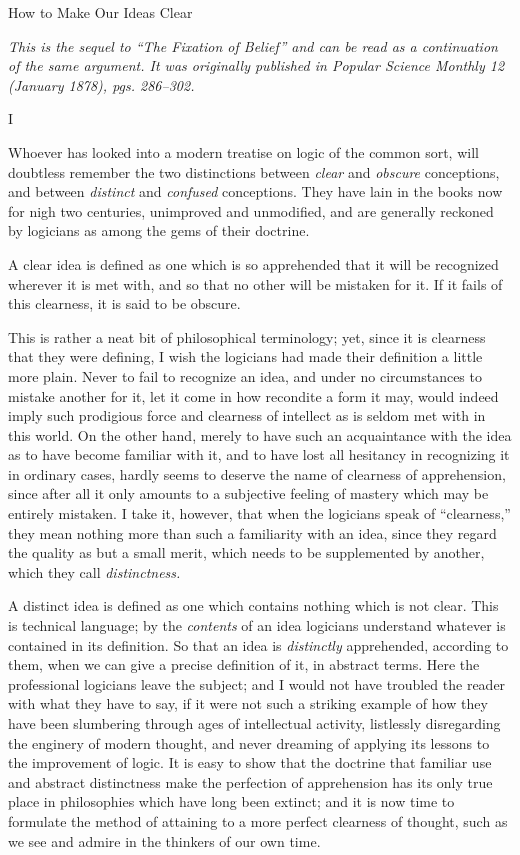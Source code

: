 \documentclass[]{article}
\newcommand{\hbreak}{\par\noindent\begin{tabular*}{\linewidth}{c}\hline\hline\end{tabular*}\par}
\newcommand{\itemtitle}[1]{\pagebreak[2]\hbreak\begin{center}{\Large\sc #1}\end{center}}
\newcommand{\itemcomment}[1]{\noindent\emph{#1}}
\newcommand{\itemsection}[1]{\bigskip\centerline{#1}\nopagebreak}
\begin{document}
\itemtitle{How to Make Our Ideas Clear}
\itemcomment{This is the sequel to ``The Fixation of Belief'' and can be read as a continuation of the same argument. It was originally published in \emph{Popular Science Monthly} 12 (January 1878), pgs. 286--302.}

\itemsection{I}

Whoever has looked into a modern treatise on logic of the common sort, will doubtless remember the two distinctions between \emph{clear} and \emph{obscure} conceptions, and between \emph{distinct} and \emph{confused} conceptions. They have lain in the books now for nigh two centuries, unimproved and unmodified, and are generally reckoned by logicians as among the gems of their doctrine.


A clear idea is defined as one which is so apprehended that it will be recognized wherever it is met with, and so that no other will be mistaken for it. If it fails of this clearness, it is said to be obscure.


This is rather a neat bit of philosophical terminology; yet, since it is clearness that they were defining, I wish the logicians had made their definition a little more plain. Never to fail to recognize an idea, and under no circumstances to mistake another for it, let it come in how recondite a form it may, would indeed imply such prodigious force and clearness of intellect as is seldom met with in this world. On the other hand, merely to have such an acquaintance with the idea as to have become familiar with it, and to have lost all hesitancy in recognizing it in ordinary cases, hardly seems to deserve the name of clearness of apprehension, since after all it only amounts to a subjective feeling of mastery which may be entirely mistaken. I take it, however, that when the logicians speak of ``clearness,'' they mean nothing more than such a familiarity with an idea, since they regard the quality as but a small merit, which needs to be supplemented by another, which they call \emph{distinctness.}

A distinct idea is defined as one which contains nothing which is not clear. This is technical language; by the \emph{contents} of an idea logicians understand whatever is contained in its definition. So that an idea is \emph{distinctly} apprehended, according to them, when we can give a precise definition of it, in abstract terms. Here the professional logicians leave the subject; and I would not have troubled the reader with what they have to say, if it were not such a striking example of how they have been slumbering through ages of intellectual activity, listlessly disregarding the enginery of modern thought, and never dreaming of applying its lessons to the improvement of logic. It is easy to show that the doctrine that familiar use and abstract distinctness make the perfection of apprehension has its only true place in philosophies which have long been extinct; and it is now time to formulate the method of attaining to a more perfect clearness of thought, such as we see and admire in the thinkers of our own time.
\end{document}
